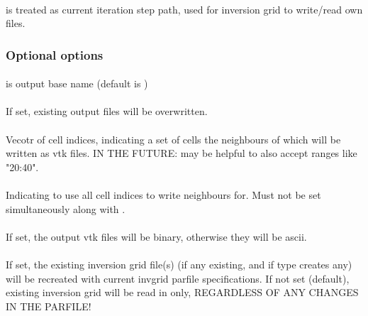 \paragraph{}
 is treated as current iteration step path, used for inversion grid to write/read own files.
\subsubsection{Optional options}
\paragraph{}
 is output base name (default is )
\paragraph{}
If set, existing output files will be overwritten.
\paragraph{}
Vecotr of  cell indices, indicating a set of cells the neighbours of which will be written as 
vtk files. IN THE FUTURE: may be helpful to also accept ranges like "20:40".
\paragraph{}
Indicating to use all cell indices to write neighbours for. Must not be set simultaneously along with .
\paragraph{}
If set, the output vtk files will be binary, otherwise they will be ascii.
\paragraph{}
If set, the existing inversion grid file(s) (if any existing, and if type creates any) will be recreated with current invgrid parfile specifications. If not set (default), existing inversion grid will be read in only, REGARDLESS OF ANY CHANGES IN THE PARFILE!
%
%
